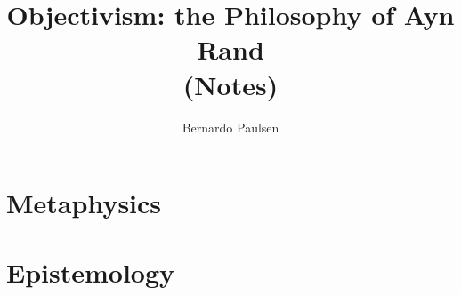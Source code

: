 \documentclass{book}
\title{Objectivism: the Philosophy of Ayn Rand \\
    (Notes)}
\author{Bernardo Paulsen}
\begin{document}
\maketitle
\tableofcontents

\frontmatter





\mainmatter

\part{Metaphysics}
\label{part:metaphysics}




\part{Epistemology}
\label{part:epistemology}






 





\backmatter


\end{document}
